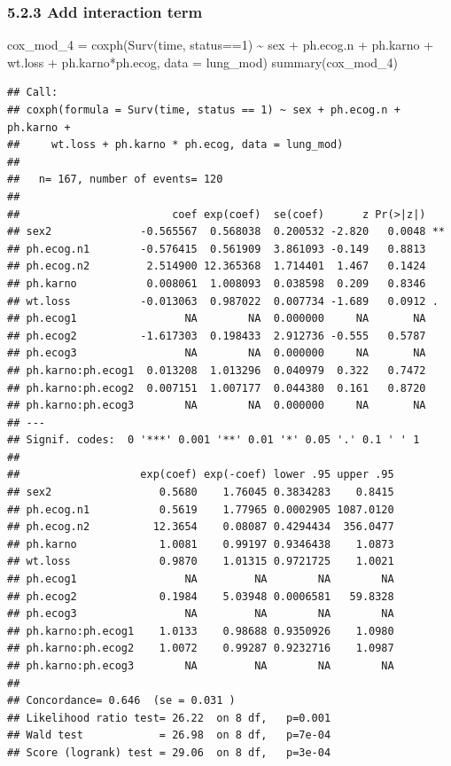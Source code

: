 \documentclass[
]{article}
\newenvironment{Shaded}{\begin{snugshade}}{\end{snugshade}}
\newcommand{\AttributeTok}[1]{\textcolor[rgb]{0.77,0.63,0.00}{#1}}
\newcommand{\DecValTok}[1]{\textcolor[rgb]{0.00,0.00,0.81}{#1}}
\newcommand{\FunctionTok}[1]{\textcolor[rgb]{0.00,0.00,0.00}{#1}}
\newcommand{\NormalTok}[1]{#1}
\newcommand{\OtherTok}[1]{\textcolor[rgb]{0.56,0.35,0.01}{#1}}
\newcommand{\SpecialCharTok}[1]{\textcolor[rgb]{0.00,0.00,0.00}{#1}}
\begin{document}
\hypertarget{add-interaction-term}{%
\subsubsection{5.2.3 Add interaction term}\label{add-interaction-term}}

\begin{Shaded}
\begin{Highlighting}[]
\NormalTok{cox\_mod\_4 }\OtherTok{=} \FunctionTok{coxph}\NormalTok{(}\FunctionTok{Surv}\NormalTok{(time, status}\SpecialCharTok{==}\DecValTok{1}\NormalTok{) }\SpecialCharTok{\textasciitilde{}}\NormalTok{ sex }\SpecialCharTok{+}\NormalTok{ ph.ecog.n }\SpecialCharTok{+}\NormalTok{ ph.karno }\SpecialCharTok{+}\NormalTok{ wt.loss }\SpecialCharTok{+}\NormalTok{ ph.karno}\SpecialCharTok{*}\NormalTok{ph.ecog, }
                  \AttributeTok{data =}\NormalTok{ lung\_mod)}
\FunctionTok{summary}\NormalTok{(cox\_mod\_4)}
\end{Highlighting}
\end{Shaded}

\begin{verbatim}
## Call:
## coxph(formula = Surv(time, status == 1) ~ sex + ph.ecog.n + ph.karno + 
##     wt.loss + ph.karno * ph.ecog, data = lung_mod)
## 
##   n= 167, number of events= 120 
## 
##                        coef exp(coef)  se(coef)      z Pr(>|z|)   
## sex2              -0.565567  0.568038  0.200532 -2.820   0.0048 **
## ph.ecog.n1        -0.576415  0.561909  3.861093 -0.149   0.8813   
## ph.ecog.n2         2.514900 12.365368  1.714401  1.467   0.1424   
## ph.karno           0.008061  1.008093  0.038598  0.209   0.8346   
## wt.loss           -0.013063  0.987022  0.007734 -1.689   0.0912 . 
## ph.ecog1                 NA        NA  0.000000     NA       NA   
## ph.ecog2          -1.617303  0.198433  2.912736 -0.555   0.5787   
## ph.ecog3                 NA        NA  0.000000     NA       NA   
## ph.karno:ph.ecog1  0.013208  1.013296  0.040979  0.322   0.7472   
## ph.karno:ph.ecog2  0.007151  1.007177  0.044380  0.161   0.8720   
## ph.karno:ph.ecog3        NA        NA  0.000000     NA       NA   
## ---
## Signif. codes:  0 '***' 0.001 '**' 0.01 '*' 0.05 '.' 0.1 ' ' 1
## 
##                   exp(coef) exp(-coef) lower .95 upper .95
## sex2                 0.5680    1.76045 0.3834283    0.8415
## ph.ecog.n1           0.5619    1.77965 0.0002905 1087.0120
## ph.ecog.n2          12.3654    0.08087 0.4294434  356.0477
## ph.karno             1.0081    0.99197 0.9346438    1.0873
## wt.loss              0.9870    1.01315 0.9721725    1.0021
## ph.ecog1                 NA         NA        NA        NA
## ph.ecog2             0.1984    5.03948 0.0006581   59.8328
## ph.ecog3                 NA         NA        NA        NA
## ph.karno:ph.ecog1    1.0133    0.98688 0.9350926    1.0980
## ph.karno:ph.ecog2    1.0072    0.99287 0.9232716    1.0987
## ph.karno:ph.ecog3        NA         NA        NA        NA
## 
## Concordance= 0.646  (se = 0.031 )
## Likelihood ratio test= 26.22  on 8 df,   p=0.001
## Wald test            = 26.98  on 8 df,   p=7e-04
## Score (logrank) test = 29.06  on 8 df,   p=3e-04
\end{verbatim}
\end{document}

